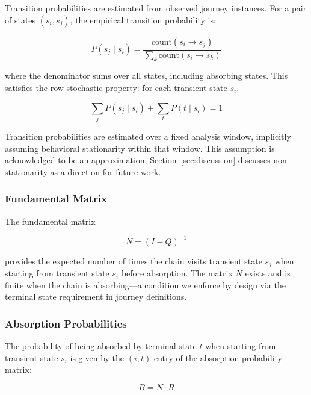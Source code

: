 \documentclass[12pt, a4paper]{article}
\begin{document}
Transition probabilities are estimated from observed journey instances. For a pair of states $(s_i, s_j)$, the empirical transition probability is:

\begin{equation}
  P(s_j \mid s_i) = \frac{\text{count}(s_i \to s_j)}{\sum_k \text{count}(s_i \to s_k)}
  \label{eq:transition}
\end{equation}

where the denominator sums over all states, including absorbing states. This satisfies the row-stochastic property: for each transient state $s_i$,

\begin{equation}
  \sum_j P(s_j \mid s_i) + \sum_t P(t \mid s_i) = 1
  \label{eq:rowstochastic}
\end{equation}

Transition probabilities are estimated over a fixed analysis window, implicitly assuming behavioral stationarity within that window. This assumption is acknowledged to be an approximation; Section~\ref{sec:discussion} discusses non-stationarity as a direction for future work.

\subsubsection{Fundamental Matrix}

The fundamental matrix

\begin{equation}
  N = (I - Q)^{-1}
  \label{eq:fundamental}
\end{equation}

provides the expected number of times the chain visits transient state $s_j$ when starting from transient state $s_i$ before absorption. The matrix $N$ exists and is finite when the chain is absorbing---a condition we enforce by design via the terminal state requirement in journey definitions.

\subsubsection{Absorption Probabilities}

The probability of being absorbed by terminal state $t$ when starting from transient state $s_i$ is given by the $(i, t)$ entry of the absorption probability matrix:

\begin{equation}
  B = N \cdot R
  \label{eq:absorption}
\end{equation}
\end{document}
